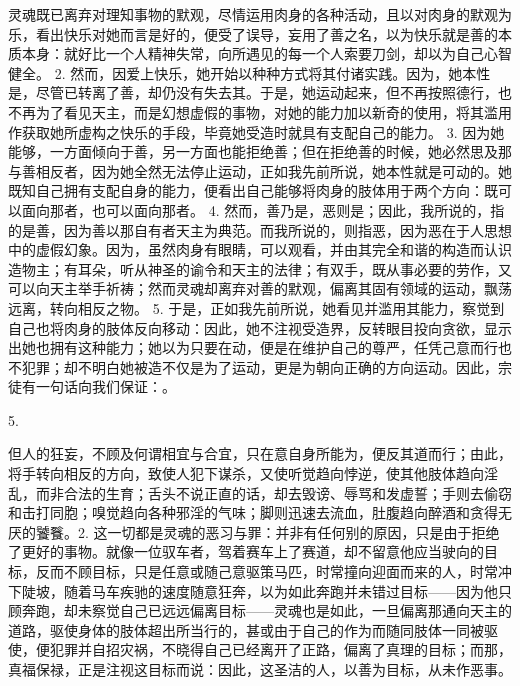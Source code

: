 灵魂既已离弃对理知事物的默观，尽情运用肉身的各种活动，且以对肉身的默观为乐，看出快乐对她而言是好的，便受了误导，妄用了善之名，以为快乐就是善的本质本身：就好比一个人精神失常，向所遇见的每一个人索要刀剑，却以为自己心智健全。 2. 然而，因爱上快乐，她开始以种种方式将其付诸实践。因为，她本性是，尽管已转离了善，却仍没有失去其。于是，她运动起来，但不再按照德行，也不再为了看见天主，而是幻想虚假的事物，对她的能力加以新奇的使用，将其滥用作获取她所虚构之快乐的手段，毕竟她受造时就具有支配自己的能力。 3. 因为她能够，一方面倾向于善，另一方面也能拒绝善；但在拒绝善的时候，她必然思及那与善相反者，因为她全然无法停止运动，正如我先前所说，她本性就是可动的。她既知自己拥有支配自身的能力，便看出自己能够将肉身的肢体用于两个方向：既可以面向那者，也可以面向那者。 4. 然而，善乃是，恶则是；因此，我所说的，指的是善，因为善以那自有者天主为典范。而我所说的，则指恶，因为恶在于人思想中的虚假幻象。因为，虽然肉身有眼睛，可以观看，并由其完全和谐的构造而认识造物主；有耳朵，听从神圣的谕令和天主的法律；有双手，既从事必要的劳作，又可以向天主举手祈祷；然而灵魂却离弃对善的默观，偏离其固有领域的运动，飘荡远离，转向相反之物。 5. 于是，正如我先前所说，她看见并滥用其能力，察觉到自己也将肉身的肢体反向移动：因此，她不注视受造界，反转眼目投向贪欲，显示出她也拥有这种能力；她以为只要在动，便是在维护自己的尊严，任凭己意而行也不犯罪；却不明白她被造不仅是为了运动，更是为朝向正确的方向运动。因此，宗徒有一句话向我们保证：。\par

5. \par

但人的狂妄，不顾及何谓相宜与合宜，只在意自身所能为，便反其道而行；由此，将手转向相反的方向，致使人犯下谋杀，又使听觉趋向悖逆，使其他肢体趋向淫乱，而非合法的生育；舌头不说正直的话，却去毁谤、辱骂和发虚誓；手则去偷窃和击打同胞；嗅觉趋向各种邪淫的气味；脚则迅速去流血，肚腹趋向醉酒和贪得无厌的饕餮。2. 这一切都是灵魂的恶习与罪：并非有任何别的原因，只是由于拒绝了更好的事物。就像一位驭车者，驾着赛车上了赛道，却不留意他应当驶向的目标，反而不顾目标，只是任意或随己意驱策马匹，时常撞向迎面而来的人，时常冲下陡坡，随着马车疾驰的速度随意狂奔，以为如此奔跑并未错过目标——因为他只顾奔跑，却未察觉自己已远远偏离目标——灵魂也是如此，一旦偏离那通向天主的道路，驱使身体的肢体超出所当行的，甚或由于自己的作为而随同肢体一同被驱使，便犯罪并自招灾祸，不晓得自己已经离开了正路，偏离了真理的目标；而那，真福保禄，正是注视这目标而说：因此，这圣洁的人，以善为目标，从未作恶事。\par

